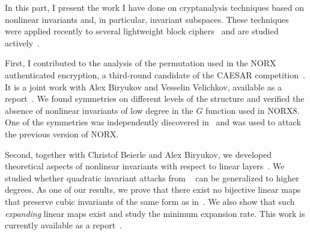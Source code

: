 In this part, I present the work I have done on cryptanalysis techniques based on nonlinear invariants and, in particular, invariant subspaces. These techniques were applied recently to several lightweight block ciphers~\cite{InvSpacePrint,NonlinInv} and are studied actively~\cite{NIproof,eigenNI,genNI,NIrevisited}.

First, I contributed to the analysis of the permutation used in the NORX authenticated encryption, a third-round candidate of the CAESAR competition~\cite{CAESAR}. It is a joint work with Alex Biryukov and Vesselin Velichkov, available as a report~\cite{OurNORX}.
We found symmetries on different levels of the structure and verified the absence of nonlinear invariants of low degree in the $G$ function used in NORX8. One of the symmetries was independently discovered in~\cite{NORXfse} and was used to attack the previous version of NORX.

Second, together with Christof Beierle and Alex Biryukov, we developed theoretical aspects of nonlinear invariants with respect to linear layers~\cite{OurNLI}. We studied whether quadratic invariant attacks from ~\cite{NonlinInv} can be generalized to higher degrees. As one of our results, we prove that there exist no bijective linear maps that preserve cubic invariants of the same form as in~\cite{NonlinInv}. We also show that such \emph{expanding} linear maps exist and study the minimum expansion rate. This work is currently available as a report~\cite{OurNLI}.